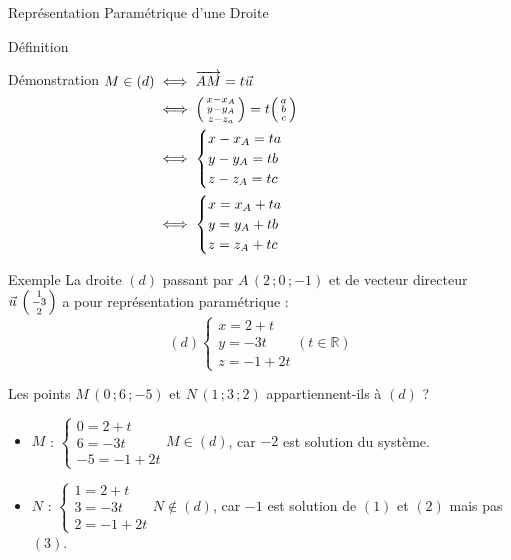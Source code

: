 \documentclass{coursbook}
\begin{document}
\begin{Gpartie}{Représentation Paramétrique d'une Droite}
\begin{Spartie}{Définition}
\begin{SSpartie}{Démonstration}
                $\begin{aligned}[t]
                    M\in(d)&\iff\overrightarrow{AM}=t\vec{u} \\
                    &\iff\begin{psmallmatrix} x-x_A \\ y-y_A \\ z-z_a \end{psmallmatrix}=t\begin{psmallmatrix} a \\ b \\ c \end{psmallmatrix} \\
                    &\iff\begin{cases}x-x_A=ta \\ y-y_A=tb \\ z-z_A= t c \end{cases} \\ %
                    &\iff\begin{cases}x=x_A+ta \\ y=y_A+tb \\ z=z_A+ t c \end{cases}
                \end{aligned}$
            \end{SSpartie}
        \end{Spartie}
        \vfill
        \pagebreak
        \begin{Spartie}{Exemple} 
            La droite $(d)$ passant par $A\,\left(2\,;0\,;-1\right)$ et de vecteur directeur $\vec{u}~\begin{psmallmatrix}1 \\ -3 \\ 2\end{psmallmatrix}$ a pour représentation paramétrique : \[(d)\begin{cases} x=2+t \\ y=-3t \\ z=-1+2t
            \end{cases}\left(t\in\mathbb{R}\right)\]

            Les points $M\,\left(0\,;6\,;-5\right)$ et $N\,\left(1\,;3\,;2\right)$ appartiennent-ils à $(d)$ ?
            \begin{itemize}
                \item $M$ : $\begin{cases} 0=2+t \\ 6=-3t \\ -5=-1+2t \end{cases}M\in(d)$, car $-2$ est solution du système.
                \item $N$ : $\begin{cases} 1=2+t \\ 3=-3t \\ 2=-1+2t \end{cases}N\notin(d)$, car $-1$ est solution de $(1)$ et $(2)$ mais pas $(3)$.
            \end{itemize}
        \end{Spartie}
    \end{Gpartie}
\end{document}
